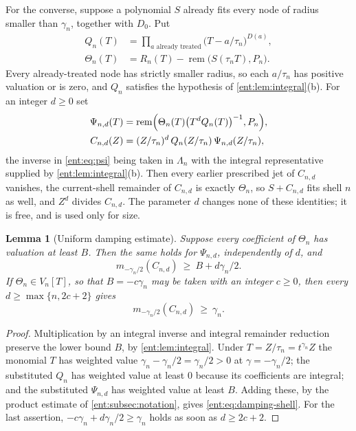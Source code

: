 \documentclass[11pt]{article}
\theoremstyle{plain}
\newtheorem{lemma}[lemma]{Lemma}
\theoremstyle{plain}
\theoremstyle{plain}
\theoremstyle{definition}
\theoremstyle{definition}
\theoremstyle{definition}
\theoremstyle{definition}
\theoremstyle{remark}
\DeclareMathOperator{\remp}{rem}\DeclareMathOperator{\Res}{Res}
\begin{document}
For the converse, suppose a polynomial $S$ already fits every node of radius
smaller than $\gamma_n$, together with $D_0$. Put
\begin{align}
 Q_n(T)&=\prod_{a\text{ already treated}}\bigl(T-a/\tau_n\bigr)^{D(a)},
 \label{ent:eq:Qn}\\
 \Theta_n(T)&=R_n(T)-\remp\bigl(S(\tau_nT),P_n\bigr).
 \label{ent:eq:theta}
\end{align}
Every already-treated node has strictly smaller radius, so each $a/\tau_n$
has positive valuation or is zero, and $Q_n$ satisfies the hypothesis of
\cref{ent:lem:integral}(b). For an integer $d\ge0$ set
\begin{align}
 \Psi_{n,d}(T)&=\remp\Bigl(\Theta_n(T)\bigl(T^dQ_n(T)\bigr)^{-1},P_n\Bigr),
 \label{ent:eq:psi}\\
 C_{n,d}(Z)&=(Z/\tau_n)^d\,Q_n(Z/\tau_n)\,\Psi_{n,d}(Z/\tau_n),
 \label{ent:eq:correction}
\end{align}
the inverse in \eqref{ent:eq:psi} being taken in $\Lambda_n$ with the
integral representative supplied by \cref{ent:lem:integral}(b). Then every
earlier prescribed jet of $C_{n,d}$ vanishes, the current-shell remainder of
$C_{n,d}$ is exactly $\Theta_n$, so $S+C_{n,d}$ fits shell $n$ as well, and
$Z^d$ divides $C_{n,d}$. The parameter $d$ changes none of these identities;
it is free, and is used only for size.

\begin{lemma}[Uniform damping estimate]\label{ent:lem:damping-shell}
Suppose every coefficient of $\Theta_n$ has valuation at least $B$. Then the
same holds for $\Psi_{n,d}$, independently of $d$, and
\begin{equation}\label{ent:eq:damping-shell}
 m_{-\gamma_n/2}(C_{n,d})\ \ge\ B+d\gamma_n/2 .
\end{equation}
If $\Theta_n\in V_n[T]$, so that $B=-c\gamma_n$ may be taken with an integer
$c\ge0$, then every $d\ge\max\{n,2c+2\}$ gives
\begin{equation}\label{ent:eq:damping-target}
 m_{-\gamma_n/2}(C_{n,d})\ \ge\ \gamma_n .
\end{equation}
\end{lemma}
\begin{proof}
Multiplication by an integral inverse and integral remainder reduction
preserve the lower bound $B$, by \cref{ent:lem:integral}. Under $T=Z/\tau_n
=t^{\gamma_n}Z$ the monomial $T$ has weighted value
$\gamma_n-\gamma_n/2=\gamma_n/2>0$ at $\gamma=-\gamma_n/2$; the substituted
$Q_n$ has weighted value at least $0$ because its coefficients are integral;
and the substituted $\Psi_{n,d}$ has weighted value at least $B$. Adding
these, by the product estimate of \cref{ent:subsec:notation}, gives
\eqref{ent:eq:damping-shell}. For the last assertion,
$-c\gamma_n+d\gamma_n/2\ge\gamma_n$ holds as soon as $d\ge2c+2$.
\end{proof}
\end{document}
